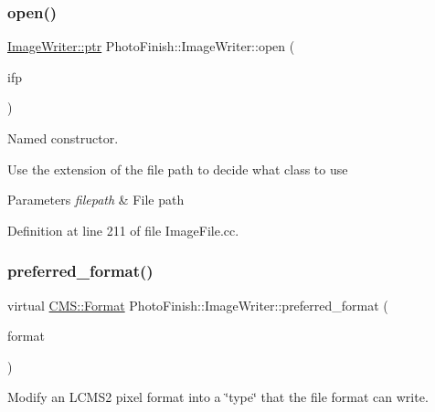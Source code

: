 \subsubsection{\texorpdfstring{open()}{open()}}
{\footnotesize\ttfamily \hyperlink{class_photo_finish_1_1_image_writer_ad09511cf9f26b7cec2ca0fb6ae361aac}{Image\+Writer\+::ptr} Photo\+Finish\+::\+Image\+Writer\+::open (\begin{DoxyParamCaption}\item[{const \hyperlink{class_photo_finish_1_1_image_filepath}{Image\+Filepath} \&}]{ifp }\end{DoxyParamCaption})\hspace{0.3cm}{\ttfamily [static]}}



Named constructor. 

Use the extension of the file path to decide what class to use 
\begin{DoxyParams}{Parameters}
{\em filepath} & File path \\
\hline
\end{DoxyParams}


Definition at line 211 of file Image\+File.\+cc.

\mbox{\label{class_photo_finish_1_1_image_writer_a83441e9a01ad47b3bb0e5efb1c751770}} 
\subsubsection{\texorpdfstring{preferred\+\_\+format()}{preferred\_format()}}
{\footnotesize\ttfamily virtual \hyperlink{class_c_m_s_1_1_format}{C\+M\+S\+::\+Format} Photo\+Finish\+::\+Image\+Writer\+::preferred\+\_\+format (\begin{DoxyParamCaption}\item[{\hyperlink{class_c_m_s_1_1_format}{C\+M\+S\+::\+Format}}]{format }\end{DoxyParamCaption})\hspace{0.3cm}{\ttfamily [pure virtual]}}



Modify an L\+C\+M\+S2 pixel format into a \char`\"{}type\char`\"{} that the file format can write. 



